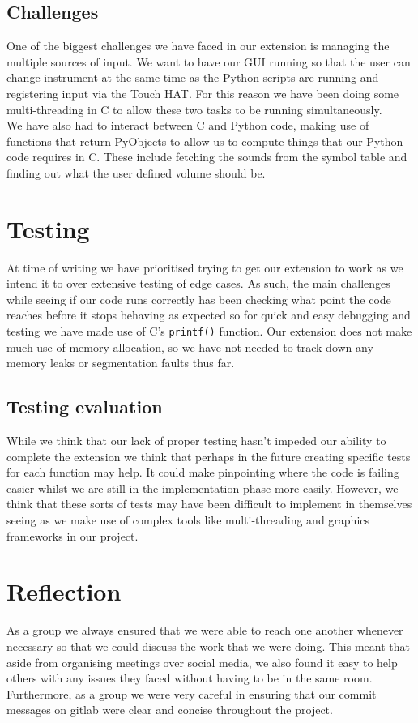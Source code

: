 \documentclass[11pt]{article}
\begin{document}
\subsection{Challenges}
	One of the biggest challenges we have faced in our extension is managing the multiple sources of input. We want to have our GUI running so that the user can change instrument at the same time as the Python scripts are running and registering input via the Touch HAT. For this reason we have been doing some multi-threading in C to allow these two tasks to be running simultaneously.\\
	
	We have also had to interact between C and Python code, making use of functions that return PyObjects to allow us to compute things that our Python code requires in C. These include fetching the sounds from the symbol table and finding out what the user defined volume should be.

\section{Testing}
	At time of writing we have prioritised trying to get our extension to work as we intend it to over extensive testing of edge cases. As such, the main challenges while seeing if our code runs correctly has been checking what point the code reaches before it stops behaving as expected so for quick and easy debugging and testing we have made use of C's  \texttt{printf()} function. Our extension does not make much use of memory allocation, so we have not needed to track down any memory leaks or segmentation faults thus far.

\subsection{Testing evaluation}
While we think that our lack of proper testing hasn't impeded our ability to complete the extension we think that perhaps in the future creating specific tests for each function may help. It could make pinpointing where the code is failing easier whilst we are still in the implementation phase more easily. However, we think that these sorts of tests may have been difficult to implement in themselves seeing as we make use of complex tools like multi-threading and graphics frameworks in our project.

\section{Reflection}
As a group we always ensured that we were able to reach one another whenever necessary so that we could discuss the work that we were doing. This meant that aside from organising meetings over social media, we also found it easy to help others with any issues they faced without having to be in the same room. Furthermore, as a group we were very careful in ensuring that our commit messages on gitlab were clear and concise throughout the project.\\
\end{document}
